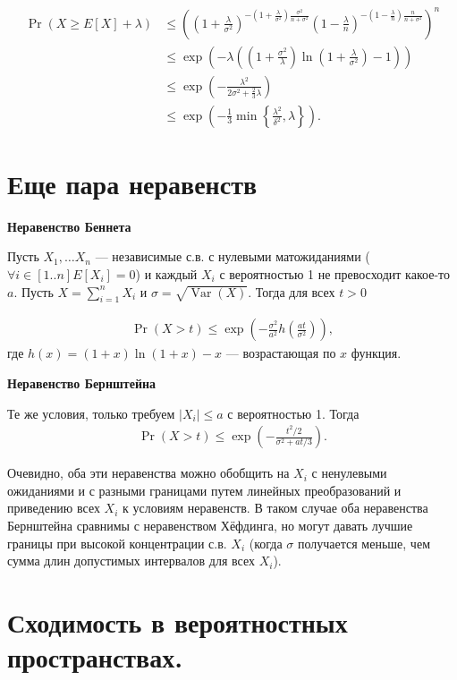 \documentclass[12pt]{article}
\DeclareMathOperator{\Var}{Var}
\begin{document}
\begin{align*}
  \Pr(X \ge E[X] + \lambda) &\le \left(\left(1 + \frac{\lambda}{\sigma^2}\right)^{-(1 + \frac{\lambda}{\sigma^2})\frac{\sigma^2}{n + \sigma^2}} \left(1 - \frac{\lambda}{n}\right)^{-(1 - \frac{\lambda}{n})\frac{n}{n + \sigma^2}} \right)^n \\
  &\le \exp\left(-\lambda\left(\left(1 + \frac{\sigma^2}{\lambda}\right)\ln\left(1 + \frac{\lambda}{\sigma^2}\right) - 1\right)\right) \\
  &\le \exp\left(-\frac{\lambda^2}{2\sigma^2 + \frac{2}{3}\lambda}\right) \\
  &\le \exp\left(-\frac{1}{3} \min\left\{ \frac{\lambda^2}{\delta^2}, \lambda\right\}\right).
\end{align*}

\section{Еще пара неравенств}

\textbf{Неравенство Беннета}

Пусть $X_1, \dots X_n$ --- независимые с.в. с нулевыми матожиданиями ($\forall i\in[1..n] E[X_i] = 0$) и каждый $X_i$ с вероятностью 1 не превосходит какое-то $a$. Пусть $X = \sum_{i = 1}^n X_i$ и $\sigma = \sqrt{\Var(X)}$. Тогда для всех $t > 0$

\begin{align*}
  \Pr(X > t) \le \exp\left(-\frac{\sigma^2}{a^2} h\left(\frac{at}{\sigma^2}\right)\right),
\end{align*}
где $h(x) = (1 + x)\ln(1 + x) - x$ --- возрастающая по $x$ функция.

\textbf{Неравенство Бернштейна}

Те же условия, только требуем $|X_i| \le a$ с вероятностью 1. Тогда 
\begin{align*}
  \Pr(X > t) \le \exp\left(-\frac{t^2 / 2}{\sigma^2 + at/3}\right).
\end{align*}

Очевидно, оба эти неравенства можно обобщить на $X_i$ с ненулевыми ожиданиями и с разными границами путем линейных преобразований и приведению всех $X_i$ к условиям неравенств. В таком случае оба неравенства Бернштейна сравнимы с неравенством Хёфдинга, но могут давать лучшие границы при высокой концентрации с.в. $X_i$ (когда $\sigma$ получается меньше, чем сумма длин допустимых интервалов для всех $X_i$).

\section{Сходимость в вероятностных пространствах.}
\end{document}
